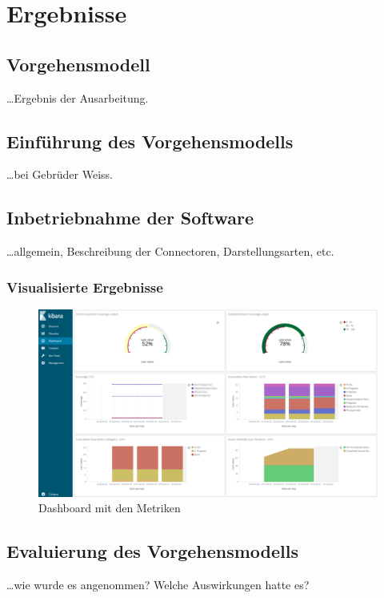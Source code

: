 \chapter{Ergebnisse}

\section{Vorgehensmodell}

\ldots Ergebnis der Ausarbeitung.

\section{Einführung des Vorgehensmodells}

\ldots bei Gebrüder Weiss.

\section{Inbetriebnahme der Software}

\ldots allgemein, Beschreibung der Connectoren, Darstellungsarten, etc.

\subsection{Visualisierte Ergebnisse}

\begin{savenotes}
    \begin{figure}[H] 
        \centering
            \includegraphics[width=1.0\textwidth]{img/dashboard.png}
        \caption{Dashboard mit den Metriken}\label{fig:dashboard}
    \end{figure}
\end{savenotes}

\section{Evaluierung des Vorgehensmodells}

\ldots wie wurde es angenommen? Welche Auswirkungen hatte es?
